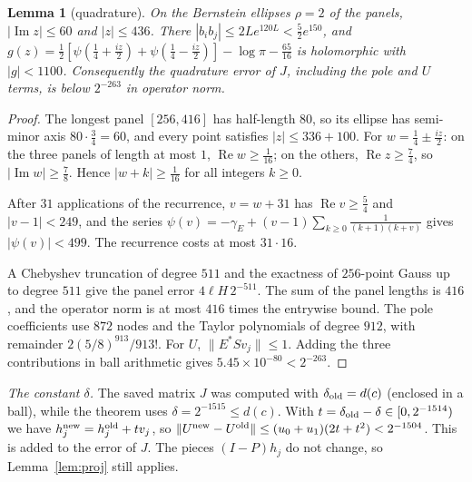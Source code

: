 \documentclass[11pt]{amsart}
\newtheorem{lemma}[proposition]{Lemma}
\theoremstyle{remark}
\numberwithin{equation}{section}
\begin{document}
\begin{lemma}[quadrature]\label{lem:quad}
On the Bernstein ellipses $\rho=2$ of the panels, $|\operatorname{Im}z|\le60$ and $|z|\le436$. There $|b_ib_j|\le2Le^{120L}<\frac52e^{150}$, and $g(z)=\frac12[\psi(\frac14+\frac{iz}2)+\psi(\frac14-\frac{iz}2)]-\log\pi-\frac{65}{16}$ is holomorphic with $|g|<1100$. Consequently the quadrature error of $J$, including the pole and $U$ terms, is below $2^{-263}$ in operator norm.
\end{lemma}
\begin{proof}
The longest panel $[256,416]$ has half-length $80$, so its ellipse has semi-minor axis $80\cdot\frac34=60$, and every point satisfies $|z|\le336+100$. For $w=\frac14\pm\frac{iz}2$: on the three panels of length at most $1$, $\operatorname{Re}w\ge\frac1{16}$; on the others, $\operatorname{Re}z\ge\frac74$, so $|\operatorname{Im}w|\ge\frac78$. Hence $|w+k|\ge\frac1{16}$ for all integers $k\ge0$.

After $31$ applications of the recurrence, $v=w+31$ has $\operatorname{Re}v\ge\frac54$ and $|v-1|<249$, and the series $\psi(v)=-\gamma_E+(v-1)\sum_{k\ge0}\frac1{(k+1)(k+v)}$ \cite[5.7.6]{DLMF} gives $|\psi(v)|<499$. The recurrence costs at most $31\cdot16$.

A Chebyshev truncation of degree $511$ and the exactness of $256$-point Gauss up to degree $511$ give the panel error $4\ell H\,2^{-511}$. The sum of the panel lengths is $416$, and the operator norm is at most $416$ times the entrywise bound. The pole coefficients use $872$ nodes and the Taylor polynomials of degree $912$, with remainder $2(5/8)^{913}/913!$. For $U$, $\|E^*Sv_j\|\le1$. Adding the three contributions in ball arithmetic gives $5.45\times10^{-80}<2^{-263}$.
\end{proof}

\emph{The constant $\delta$.} The saved matrix $J$ was computed with $\delta_{\rm old}=d(c)$ (enclosed in a ball), while the theorem uses $\delta=2^{-1515}\le d(c)$. With $t=\delta_{\rm old}-\delta\in[0,2^{-1514})$ we have $h_j^{\rm new}=h_j^{\rm old}+tv_j$, so $\|U^{\rm new}-U^{\rm old}\|\le(u_0+u_1)(2t+t^2)<2^{-1504}$. This is added to the error of $J$. The pieces $(I-P)h_j$ do not change, so Lemma~\ref{lem:proj} still applies.
\end{document}
